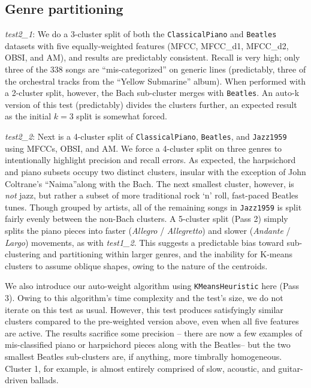 \documentclass[12pt,twocolumn,titlepage]{article}
\begin{document}
\subsection{Genre partitioning}

\emph{test2\_1}: We do a 3-cluster split of both the \texttt{ClassicalPiano} and \texttt{Beatles} datasets with five equally-weighted features (MFCC, MFCC\_d1, MFCC\_d2, OBSI, and AM), and results are predictably consistent. Recall is very high; only three of the 338 songs are ``mis-categorized'' on generic lines (predictably, three of the orchestral tracks from the ``Yellow Submarine'' album). When performed with a 2-cluster split, however, the Bach sub-cluster merges with \texttt{Beatles}. An auto-k version of this test (predictably) divides the clusters further, an expected result as the initial $k=3$ split is somewhat forced.

\emph{test2\_2}: Next is a 4-cluster split of \texttt{ClassicalPiano}, \texttt{Beatles}, and \texttt{Jazz1959} using MFCCs, OBSI, and AM. We force a 4-cluster split on three genres to intentionally highlight precision and recall errors. As expected, the harpsichord and piano subsets occupy two distinct clusters, insular with the exception of John Coltrane's ``Naima''along with the Bach. The next smallest cluster, however, is \emph{not} jazz, but rather a subset of more traditional rock `n' roll, fast-paced Beatles tunes. Though grouped by artists, all of the remaining songs in \texttt{Jazz1959} is split fairly evenly between the non-Bach clusters. A 5-cluster split (Pass 2) simply splits the piano pieces into faster (\emph{Allegro} / \emph{Allegretto}) and slower (\emph{Andante} / \emph{Largo}) movements, as with \emph{test1\_2}. This suggests a predictable bias toward sub-clustering and partitioning within larger genres, and the inability for K-means clusters to assume oblique shapes, owing to the nature of the centroids.

We also introduce our auto-weight algorithm using \texttt{KMeansHeuristic} here (Pass 3). Owing to this algorithm's time complexity and the test's size, we do not iterate on this test as usual. However, this test produces satisfyingly similar clusters compared to the pre-weighted version above, even when all five features are active. The results sacrifice some precision -- there are now a few examples of mis-classified piano or harpsichord pieces along with the Beatles-- but the two smallest Beatles sub-clusters are, if anything, more timbrally homogeneous. Cluster 1, for example, is almost entirely comprised of slow, acoustic, and guitar-driven ballads.
\end{document}
